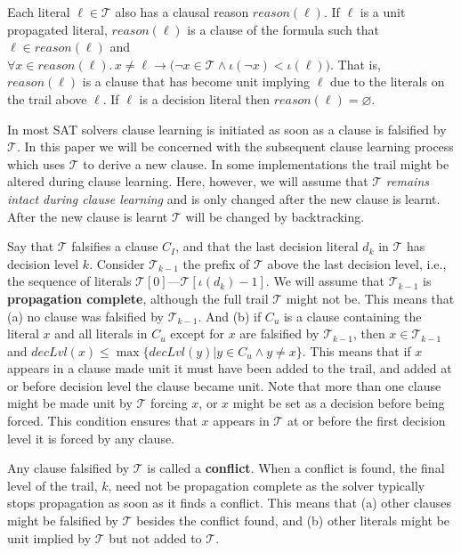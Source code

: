 \documentclass[runningheads]{llncs}
\newcommand{\sat}{SAT\xspace}
\newcommand{\trail}{\ensuremath{\mathcal{T}}}
\newcommand{\trailIdx}[1]{\ensuremath{\iota(#1)}}
\newcommand{\dlevel}[1]{\ensuremath{\mathit{decLvl}(#1)}}
\newcommand{\reason}[1]{\ensuremath{\mathit{reason}(#1)}}
\renewcommand{\implies}{\rightarrow}
\newcommand{\nf}[1]{{\color{red}{#1}}}
\begin{document}
Each literal $\ell\in\trail$ also has a clausal reason
$\reason{\ell}$. If $\ell$ is a unit propagated literal,
$\reason{\ell}$ is a clause of the formula such that
$\ell \in \reason{\ell}$ and
$\forall x \in \reason{\ell}.\, x\neq \ell \implies \bigl(\lnot x \in
\trail \land \trailIdx{\lnot x} < \trailIdx{\ell}\bigr)$. That is,
$\reason{\ell}$ is a clause that has become unit implying $\ell$ due
to the literals on the trail above $\ell$. If $\ell$ is a decision
literal then $\reason{\ell} = \varnothing$.

In most \sat solvers\nf{,} clause learning is initiated as soon as a clause
is falsified by $\trail$. In this paper we will be concerned with the
subsequent clause learning process which uses $\trail$ to derive a new
clause. In some implementations\nf{,} the trail might be altered during
clause learning. Here, however, we will assume that $\trail$
\emph{remains intact during clause learning} and is only changed after
the new clause is learnt. After the new clause is learnt $\trail$
will be changed by backtracking.

Say that $\trail$ falsifies a clause $C_I$, and that the last decision
literal $d_k$ in $\trail$ has decision level $k$. Consider
$\trail_{k-1}$ the prefix of $\trail$ above the last decision level,
i.e., the sequence of literals
$\trail[0]$---$\trail[\trailIdx{d_k}-1]$. We will assume that
$\trail_{k-1}$ is \textbf{propagation complete}, although the full
trail $\trail$ might not be. This means that (a) no clause was
falsified by $\trail_{k-1}$. And (b) if $C_u$ is a clause containing
the literal $x$ and all literals in $C_u$ except for $x$ are falsified
by $\trail_{k-1}$, then $x\in \trail_{k-1}$ and
$\dlevel{x} \leq\max\{\dlevel{y} | y\in C_u \land y\neq x\}$. This
means that if $x$ appears in a clause made unit it must have been
added to the trail, and added at or before decision level the clause
became unit. Note that more than one clause might be made unit by
$\trail$ forcing $x$, or $x$ might be set as a decision before being
forced. This condition ensures that $x$ appears in $\trail$ at or
before the first decision level it is forced by any clause.

Any clause falsified by $\trail$ is called a \textbf{conflict}. When a
conflict is found, the final level of the trail, $k$, need not be
propagation complete as the solver typically stops propagation as soon
as it finds a conflict. This means that (a) other clauses might be
falsified by $\trail$ besides the conflict found, and (b) other
literals might be unit implied by $\trail$ but not added to $\trail$.
\end{document}
